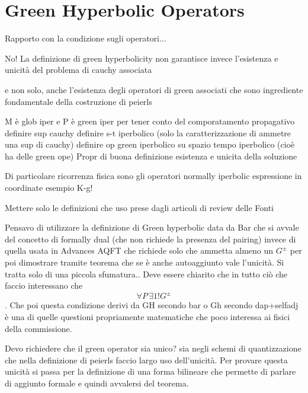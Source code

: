 \documentclass[Main]{subfiles}
\begin{document}
	\section{Green Hyperbolic Operators}
		\begin{Warning}
		Rapporto con la condizione sugli operatori...		
		
	No!		La definizione di green hyperbolicity non garantisce invece l'esistenza e unicità del problema di cauchy associata
		
		e non solo, anche l'esistenza degli operatori di green associati che sono ingrediente fondamentale della costruzione di peierls

		M è glob iper e P è green iper per tener conto del comporatamento propagativo
		definire sup cauchy
		definire s-t iperbolico (solo la caratterizzazione di ammetre una sup di cauchy)
		definire op green iperbolico su spazio tempo iperbolico (cioè ha delle green ope)
		Propr di buona definizione esistenza e unicita della soluzione
		
		Di particolare ricorrenza fisica sono gli operatori normally iperbolic
		espressione in coordinate
		esempio K-g!
		\end{Warning}		
			\begin{Warning}
				Mettere solo le definizioni che uso prese dagli articoli di review delle Fonti
		\end{Warning}	
					\begin{Warning}
				Pensavo di utilizzare la definizione di Green hyperbolic data da Bar che si avvale del concetto di formally dual (che non richiede la presenza del pairing) invece di quella usata in Advances AQFT che richiede solo che ammetta almeno un $G^\pm$  per poi dimostrare tramite teorema che se è anche autoaggiunto vale l'unicità. Si tratta solo di una piccola sfumatura.. Deve essere chiarito che in tutto ciò che faccio interessano che $$\forall P \, \exists1!G^\pm$$.
				Che poi questa condizione derivi da GH secondo bar o Gh secondo dap+selfadj è una di quelle questioni propriamente matematiche che poco interessa ai fisici della commissione.
			\end{Warning}			
			
			\begin{Warning}
			Devo richiedere che il green operator sia unico? sia negli schemi di quantizzazione che nella definizione di peierls faccio largo uso dell'unicità. 
			Per provare questa unicità si passa per la definizione di una forma bilineare che permette di parlare di aggiunto formale e quindi avvalersi del teorema.
			\end{Warning}
			
\end{document}
